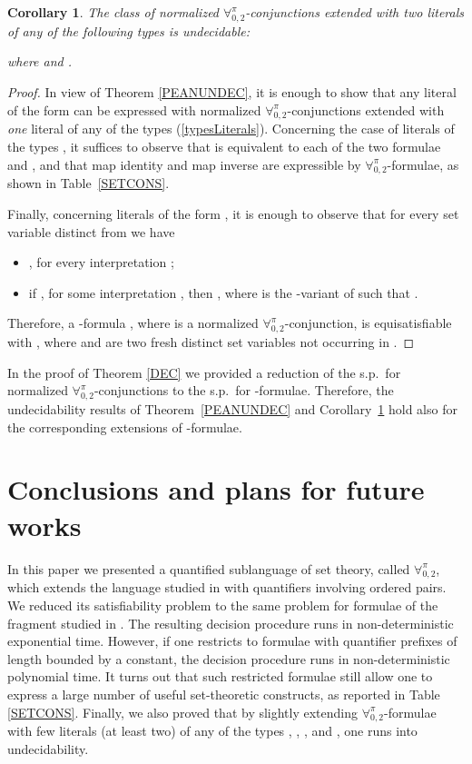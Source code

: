 \documentclass[submission,copyright,creativecommons]{eptcs}
\newtheorem{corollary}{Corollary}
\newcommand{\Lang}{\ensuremath{\mathbf{\forall}^{\pi}_{0,2}}\xspace}
\begin{document}
\begin{corollary}\label{OTHERUNDEC}
The class of normalized \Lang-conjunctions extended with two
literals of any of the following types is undecidable:

where  and .
\end{corollary}
\begin{proof}
In view of Theorem \ref{PEANUNDEC}, it is enough to show that any
literal of the form  can be expressed with
normalized \Lang-conjunctions extended with \emph{one} literal of any
of the types (\ref{typesLiterals}).  Concerning the case of literals
of the types
, 
it suffices to observe that  is equivalent
to each of the two formulae
 and 
,
and that map identity  and map inverse  
are expressible by \Lang-formulae, as shown in Table~\ref{SETCONS}.

Finally, concerning literals of the form ,
it is enough to observe that for every set variable 
distinct from  we have
\begin{itemize}
    \item , for every interpretation ;
    
    \item if , for some
    interpretation , then , where  is the
    -variant of  such that .
\end{itemize}
Therefore, a -formula , where 
is a normalized \Lang-conjunction, is equisatisfiable with , where  and  are two fresh 
distinct set variables not occurring in .
\end{proof}

In the proof of Theorem \ref{DEC} we provided a reduction of the s.p.\
for normalized \Lang-conjunctions to the s.p.\ for
\Forallpizero-formulae.  Therefore, the undecidability results of 
Theorem~\ref{PEANUNDEC} and Corollary~\ref{OTHERUNDEC} hold also for 
the corresponding extensions of \Forallpizero-formulae.

\section{Conclusions and plans for future works}
\label{CONC}

In this paper we presented a quantified sublanguage of set theory,
called \Lang, which extends the language  studied in
\cite{BreFerOmoSch1981} with quantifiers involving ordered pairs.  We
reduced its satisfiability problem to the same problem for formulae of
the fragment studied in \cite{CanLonNic2011}.  The resulting decision
procedure runs in non-deterministic exponential time.  However, if one
restricts to formulae with quantifier prefixes of length bounded by a
constant, the decision procedure runs in non-deterministic polynomial
time.  It turns out that such restricted formulae still allow one to
express a large number of useful set-theoretic constructs, as reported
in Table \ref{SETCONS}.  
Finally, we also proved that by slightly extending \Lang-formulae 
with few literals (at least two) of any of the types , , , and , one runs into 
undecidability.
\end{document}
